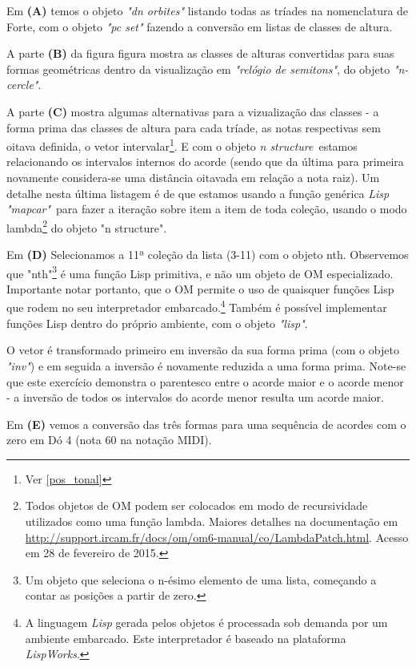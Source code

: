 \documentclass[
	12pt,				%
	openright,			%
	twoside,			%
	a4paper,			%
	english,			%
	french,				%
	spanish,			%
	brazil				%
	]{abntex2}
\begin{document}
Em \textbf{(A)} temos o objeto \textit{"dn orbites"} listando todas as tríades na nomenclatura de Forte, com o objeto \textit{"pc set"} fazendo a conversão em listas de classes de altura. 

A parte \textbf{(B)} da figura figura mostra as classes de alturas convertidas para suas formas geométricas dentro da visualização em \textit{"relógio de semitons"}, do objeto \textit{"n-cercle"}. 

A parte \textbf{(C)} mostra algumas alternativas para a vizualização das classes - a forma prima das classes de altura para cada tríade, as notas respectivas sem oitava definida, o vetor intervalar\footnote{Ver \autoref{pos_tonal}}. E com o objeto \textit{n structure}\ estamos relacionando os intervalos internos do acorde (sendo que da última para primeira novamente considera-se uma distância oitavada em relação a nota raiz). Um detalhe nesta última listagem é de que estamos usando a função genérica \textit{Lisp "mapcar"}\ para fazer a iteração sobre item a item de toda coleção, usando o modo lambda\footnote{Todos objetos de OM podem ser colocados em modo de recursividade utilizados como uma função lambda. Maiores detalhes na documentação em \url{http://support.ircam.fr/docs/om/om6-manual/co/LambdaPatch.html}. Acesso em 28 de fevereiro de 2015.} do objeto "n structure".

Em \textbf{(D)} Selecionamos a 11ª coleção da lista (3-11) com o objeto nth. Observemos que "nth"\footnote{Um objeto que seleciona o n-ésimo elemento de uma lista, começando a contar as posições a partir de zero.} é uma função Lisp primitiva, e não um objeto de OM especializado. Importante notar portanto, que o OM permite o uso de quaisquer funções Lisp que rodem no seu interpretador embarcado.\footnote{A linguagem \textit{Lisp} gerada pelos objetos é processada sob demanda por um ambiente embarcado. Este interpretador é baseado na plataforma \textit{LispWorks}. } Também é possível implementar funções Lisp dentro do próprio ambiente, com o objeto \textit{"lisp"}.

O vetor é transformado primeiro em inversão da sua forma prima (com o objeto \textit{"inv"}) e em seguida a inversão é novamente reduzida a uma forma prima. Note-se que este exercício demonstra o parentesco entre o acorde maior e o acorde menor - a inversão de todos os intervalos do acorde menor resulta um acorde maior.

Em \textbf{(E)} vemos a conversão das três formas para uma sequência de acordes com o zero em Dó 4 (nota 60 na notação MIDI).
 
\end{document}

